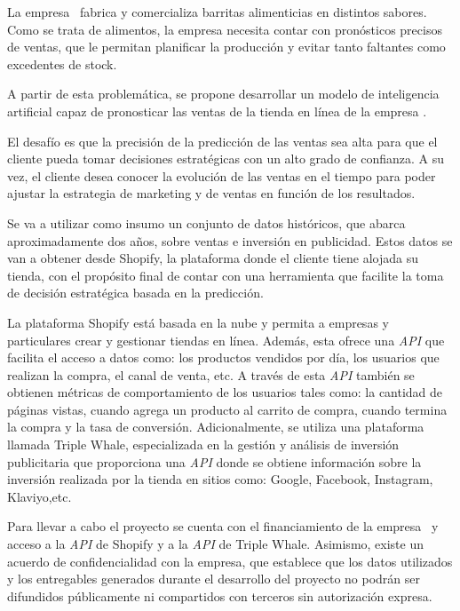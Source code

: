 \documentclass[
11pt, %
]{charter}
\begin{document}
La empresa \empclientename\ fabrica y comercializa barritas alimenticias en distintos sabores. 
Como se trata de alimentos, la empresa necesita contar con pronósticos precisos de ventas, que le permitan planificar la producción y evitar tanto faltantes como excedentes de stock.

A partir de esta problemática, se propone desarrollar un modelo de inteligencia artificial capaz de pronosticar las ventas de la tienda en línea de la empresa \empclientename. 

El desafío es que la precisión de la predicción de las ventas sea alta para que el cliente pueda tomar decisiones estratégicas con un alto grado de confianza. 
A su vez, el cliente desea conocer la evolución de las ventas en el tiempo para poder ajustar la estrategia de marketing y de ventas en función de los resultados.

Se va a utilizar como insumo un conjunto de datos históricos, que abarca aproximadamente dos años, sobre ventas e inversión en publicidad. 
Estos datos se van a obtener desde Shopify, la plataforma donde el cliente tiene alojada su tienda, con el propósito final de contar con una herramienta que facilite la toma de decisión estratégica basada en la predicción.

La plataforma Shopify está basada en la nube y permita a empresas y particulares crear y gestionar tiendas en línea. 
Además, esta ofrece una \textit{API} que facilita el acceso a datos como: los productos vendidos por día, los usuarios que realizan la compra, el canal de venta, etc. 
A través de esta \textit{API} también se obtienen métricas de comportamiento de los usuarios tales como: la cantidad de páginas vistas, cuando agrega un producto al carrito de compra, cuando termina la compra y la tasa de conversión.
Adicionalmente, se utiliza una plataforma llamada Triple Whale, especializada en la gestión y análisis de inversión publicitaria que proporciona una \textit{API} donde se obtiene información sobre la inversión realizada por la tienda en sitios como: Google, Facebook, Instagram, Klaviyo,etc.

Para llevar a cabo el proyecto se cuenta con el financiamiento de la empresa \empclientename\ y acceso a la \textit{API} de Shopify y a la \textit{API} de Triple Whale. 
Asimismo, existe un acuerdo de confidencialidad con la empresa, que establece que los datos utilizados y los entregables generados durante el desarrollo del proyecto no podrán ser difundidos públicamente ni compartidos con terceros sin autorización expresa.
\end{document}
